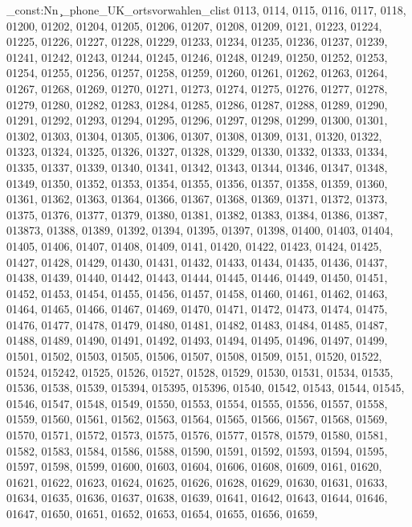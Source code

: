 \clist_const:Nn \c_phone_UK_ortsvorwahlen_clist {0113,
0114,
0115,
0116,
0117,
0118,
01200,
01202,
01204,
01205,
01206,
01207,
01208,
01209,
0121,
01223,
01224,
01225,
01226,
01227,
01228,
01229,
01233,
01234,
01235,
01236,
01237,
01239,
01241,
01242,
01243,
01244,
01245,
01246,
01248,
01249,
01250,
01252,
01253,
01254,
01255,
01256,
01257,
01258,
01259,
01260,
01261,
01262,
01263,
01264,
01267,
01268,
01269,
01270,
01271,
01273,
01274,
01275,
01276,
01277,
01278,
01279,
01280,
01282,
01283,
01284,
01285,
01286,
01287,
01288,
01289,
01290,
01291,
01292,
01293,
01294,
01295,
01296,
01297,
01298,
01299,
01300,
01301,
01302,
01303,
01304,
01305,
01306,
01307,
01308,
01309,
0131,
01320,
01322,
01323,
01324,
01325,
01326,
01327,
01328,
01329,
01330,
01332,
01333,
01334,
01335,
01337,
01339,
01340,
01341,
01342,
01343,
01344,
01346,
01347,
01348,
01349,
01350,
01352,
01353,
01354,
01355,
01356,
01357,
01358,
01359,
01360,
01361,
01362,
01363,
01364,
01366,
01367,
01368,
01369,
01371,
01372,
01373,
01375,
01376,
01377,
01379,
01380,
01381,
01382,
01383,
01384,
01386,
01387,
013873,
01388,
01389,
01392,
01394,
01395,
01397,
01398,
01400,
01403,
01404,
01405,
01406,
01407,
01408,
01409,
0141,
01420,
01422,
01423,
01424,
01425,
01427,
01428,
01429,
01430,
01431,
01432,
01433,
01434,
01435,
01436,
01437,
01438,
01439,
01440,
01442,
01443,
01444,
01445,
01446,
01449,
01450,
01451,
01452,
01453,
01454,
01455,
01456,
01457,
01458,
01460,
01461,
01462,
01463,
01464,
01465,
01466,
01467,
01469,
01470,
01471,
01472,
01473,
01474,
01475,
01476,
01477,
01478,
01479,
01480,
01481,
01482,
01483,
01484,
01485,
01487,
01488,
01489,
01490,
01491,
01492,
01493,
01494,
01495,
01496,
01497,
01499,
01501,
01502,
01503,
01505,
01506,
01507,
01508,
01509,
0151,
01520,
01522,
01524,
015242,
01525,
01526,
01527,
01528,
01529,
01530,
01531,
01534,
01535,
01536,
01538,
01539,
015394,
015395,
015396,
01540,
01542,
01543,
01544,
01545,
01546,
01547,
01548,
01549,
01550,
01553,
01554,
01555,
01556,
01557,
01558,
01559,
01560,
01561,
01562,
01563,
01564,
01565,
01566,
01567,
01568,
01569,
01570,
01571,
01572,
01573,
01575,
01576,
01577,
01578,
01579,
01580,
01581,
01582,
01583,
01584,
01586,
01588,
01590,
01591,
01592,
01593,
01594,
01595,
01597,
01598,
01599,
01600,
01603,
01604,
01606,
01608,
01609,
0161,
01620,
01621,
01622,
01623,
01624,
01625,
01626,
01628,
01629,
01630,
01631,
01633,
01634,
01635,
01636,
01637,
01638,
01639,
01641,
01642,
01643,
01644,
01646,
01647,
01650,
01651,
01652,
01653,
01654,
01655,
01656,
01659,
}
